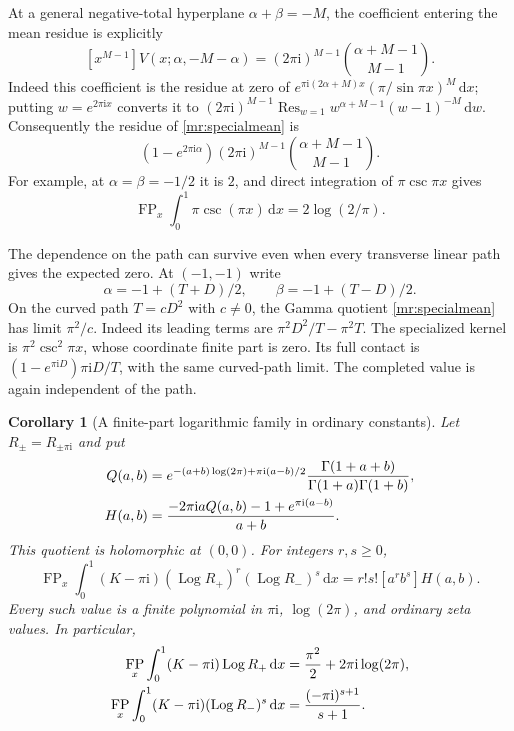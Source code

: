 \documentclass[11pt]{article}
\numberwithin{equation}{section}
\theoremstyle{plain}
\newtheorem{corollary}[theorem]{Corollary}
\theoremstyle{definition}
\theoremstyle{remark}
\DeclareMathOperator{\Log}{Log}
\DeclareMathOperator{\FP}{FP}
\DeclareMathOperator{\Res}{Res}
\newcommand{\ii}{\mathrm i}
\newcommand{\dd}{\,\mathrm d}
\begin{document}
At a general negative-total hyperplane $\alpha+\beta=-M$, the
coefficient entering the mean residue is explicitly
\begin{equation}\label{mr:residuepoly}
 [x^{M-1}]V(x;\alpha,-M-\alpha)
          =(2\pi\ii)^{M-1}\binom{\alpha+M-1}{M-1}.
\end{equation}
Indeed this coefficient is the residue at zero of
$e^{\pi\ii(2\alpha+M)x}(\pi/\sin\pi x)^M\dd x$; putting
$w=e^{2\pi\ii x}$ converts it to
$(2\pi\ii)^{M-1}\Res_{w=1}w^{\alpha+M-1}(w-1)^{-M}\dd w$.
Consequently the residue of \eqref{mr:specialmean} is
\[
 (1-e^{2\pi\ii\alpha})(2\pi\ii)^{M-1}
                              \binom{\alpha+M-1}{M-1}.
\]
For example, at $\alpha=\beta=-1/2$ it is $2$, and direct
integration of $\pi\csc\pi x$ gives
\begin{equation}\label{mr:cscfp}
               \FP_x\int_0^1\pi\csc(\pi x)\dd x
                             =2\log(2/\pi).
\end{equation}

The dependence on the path can survive even when every transverse
linear path gives the expected zero. At $(-1,-1)$ write
\[
 \alpha=-1+(T+D)/2,\qquad \beta=-1+(T-D)/2.
\]
On the curved path $T=cD^2$ with $c\ne0$, the Gamma quotient
\eqref{mr:specialmean} has limit $\pi^2/c$. Indeed its leading terms
are $\pi^2D^2/T-\pi^2T$. The specialized kernel is
$\pi^2\csc^2\pi x$, whose coordinate finite part is zero.
Its full contact is
$(1-e^{\pi\ii D})\pi\ii D/T$, with the same curved-path limit.
The completed value is again independent of the path.

\begin{corollary}[A finite-part logarithmic family in ordinary constants]
\label{mr:negativeLog}
Let $R_\pm=R_{\pm\pi\ii}$ and put
\begin{align}
 Q(a,b)&=e^{-(a+b)\log(2\pi)+\pi\ii(a-b)/2}
              \frac{\Gamma(1+a+b)}{\Gamma(1+a)\Gamma(1+b)},\notag\\
 H(a,b)&=\frac{-2\pi\ii aQ(a,b)-1+e^{\pi\ii(a-b)}}{a+b}.
       \label{mr:negativeLoggerm}
\end{align}
This quotient is holomorphic at $(0,0)$. For integers $r,s\ge0$,
\begin{equation}\label{mr:negativeLogmoment}
 \FP_x\int_0^1(K-\pi\ii)(\Log R_+)^r(\Log R_-)^s\dd x
                      =r!s![a^rb^s]H(a,b).
\end{equation}
Every such value is a finite polynomial in $\pi\ii$, $\log(2\pi)$,
and ordinary zeta values. In particular,
\begin{align}
 \FP_x\int_0^1(K-\pi\ii)\Log R_+\dd x
       &=\frac{\pi^2}{2}+2\pi\ii\log(2\pi),\notag\\
 \FP_x\int_0^1(K-\pi\ii)(\Log R_-)^s\dd x
       &=\frac{(-\pi\ii)^{s+1}}{s+1}.
       \label{mr:negativeLogexamples}
\end{align}
\end{corollary}
\end{document}
